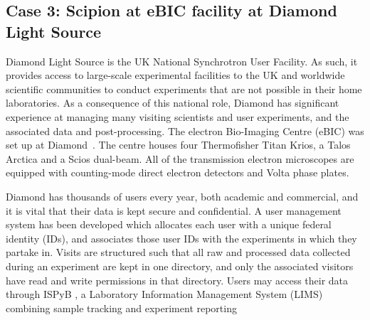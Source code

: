 
\subsection{Case 3: Scipion at eBIC facility at Diamond Light Source}

Diamond Light Source is the UK National Synchrotron User Facility.  As such, it provides access to large-scale experimental facilities to the UK and worldwide scientific communities to conduct experiments that are not possible in their home laboratories.  As a consequence of this national role, Diamond has significant experience at managing many visiting scientists and user experiments, and the associated data and post-processing.  %
The electron Bio-Imaging Centre (eBIC) was set up at Diamond~\citep{diamond2017}. The centre houses four Thermofisher Titan Krios, a Talos Arctica and a Scios dual-beam. All of the transmission electron microscopes are equipped with counting-mode direct electron detectors and Volta phase plates. 

Diamond has thousands of users every year, both academic and commercial, and it is vital that their data is kept secure and confidential. A user management system has been developed which allocates each user with a unique federal identity (IDs), and associates those user IDs with the experiments in which they partake in. Visits are structured such that all raw and processed data collected during an experiment are kept in one directory, and only the associated visitors have read and write permissions in that directory. Users may access their data through ISPyB \citep{ispb2011},  a Laboratory Information Management System (LIMS) combining sample tracking and experiment reporting  %
